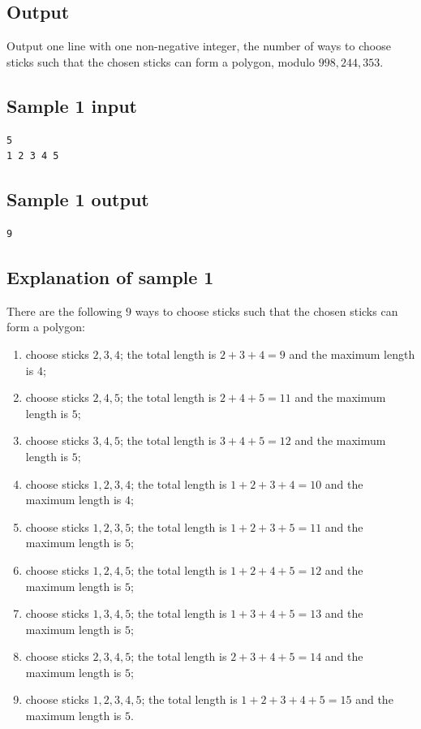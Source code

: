 \documentclass[11pt]{article}
\begin{document}
\subsection*{Output}

Output one line with one non-negative integer,
the number of ways to choose sticks such that the chosen sticks can form
a polygon, modulo $998,244,353$.

\subsection*{Sample 1 input}
\begin{verbatim}
5
1 2 3 4 5
\end{verbatim}

\subsection*{Sample 1 output}
\begin{verbatim}
9
\end{verbatim}

\subsection*{Explanation of sample 1}

There are the following $9$ ways to choose sticks such that the chosen
sticks can form a polygon:
\begin{enumerate}
\item choose sticks $2, 3, 4$; the total length is $2 + 3 + 4 = 9$ and
the maximum length is $4$;
\item choose sticks $2, 4, 5$; the total length is $2 + 4 + 5 = 11$ and
the maximum length is $5$;
\item choose sticks $3, 4, 5$; the total length is $3 + 4 + 5 = 12$ and
the maximum length is $5$;
\item choose sticks $1, 2, 3, 4$; the total length is $1 + 2 + 3 + 4 = 10$
and the maximum length is $4$;
\item choose sticks $1, 2, 3, 5$; the total length is $1 + 2 + 3 + 5 = 11$
and the maximum length is $5$;
\item choose sticks $1, 2, 4, 5$; the total length is $1 + 2 + 4 + 5 = 12$
and the maximum length is $5$;
\item choose sticks $1, 3, 4, 5$; the total length is $1 + 3 + 4 + 5 = 13$
and the maximum length is $5$;
\item choose sticks $2, 3, 4, 5$; the total length is $2 + 3 + 4 + 5 = 14$
and the maximum length is $5$;
\item choose sticks $1, 2, 3, 4, 5$; the total length is
$1 + 2 + 3 + 4 + 5 = 15$ and the maximum length is $5$.
\end{enumerate}
\end{document}
